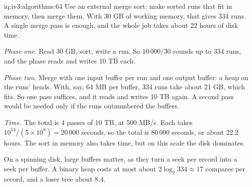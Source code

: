 \begin{solution}{iq:iv3:algorithms:64}
Use an external merge sort: make sorted runs that fit in memory, then merge them. With 30 GB of working memory, that gives 334 runs. A single merge pass is enough, and the whole job takes about 22 hours of disk time.
\enlargethispage{-3\baselineskip}%
\label{lst:iv3:al:external}

\emph{Phase one.} Read 30 GB, sort, write a run. So $10\,000 / 30$ rounds up to 334 runs, and the phase reads and writes 10 TB each.

\emph{Phase two.} Merge with one input buffer per run and one output buffer: a heap on the runs' heads. With, say, 64 MB per buffer, 334 runs take about 21 GB, which fits. So one pass suffices, and it reads and writes 10 TB again. A second pass would be needed only if the runs outnumbered the buffers.

\emph{Time.} The total is 4 passes of 10 TB, at 500 MB/s. Each takes $10^{13} / (5 \times 10^8) = 20\,000$ seconds, so the total is $80\,000$ seconds, or about 22.2 hours. The sort in memory also takes time, but on this scale the disk dominates.

On a spinning disk, large buffers matter, as they turn a seek per record into a seek per buffer. A binary heap costs at most about $2 \log_2 334 \approx 17$ compares per record, and a loser tree about $8.4$.

\end{solution}

